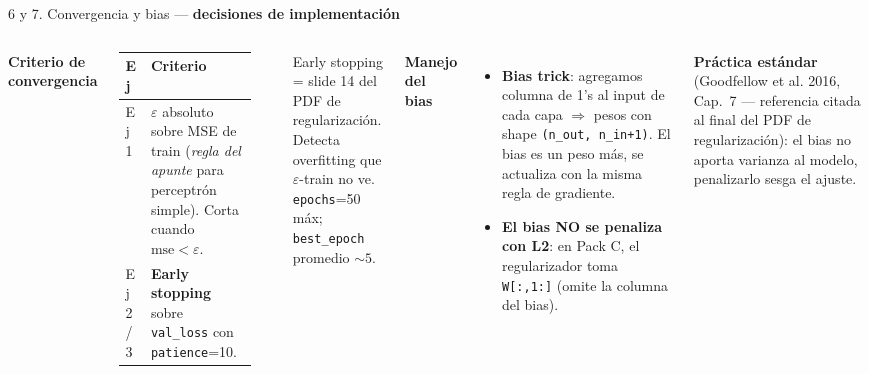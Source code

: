 \documentclass[11pt,aspectratio=169]{beamer}
\newcommand{\code}[1]{\texttt{\textcolor{accent}{#1}}}
\begin{document}
\begin{frame}{6 y 7. Convergencia y bias — \textbf{decisiones de implementación}}
\small
\begin{columns}[T]
\textbf{Criterio de convergencia}\\[0.3em]

\begin{tabular}{@{}p{0.16\linewidth}p{0.78\linewidth}@{}}
\toprule
\textbf{Ej} & \textbf{Criterio} \\
\midrule
Ej 1 & $\varepsilon$ absoluto sobre MSE de train (\emph{regla del apunte} para perceptrón simple). Corta cuando $\text{mse} < \varepsilon$. \\
\rowcolor{accent2!10}
Ej 2/3 & \textbf{Early stopping} sobre \code{val\_loss} con \code{patience}=10. \\
\bottomrule
\end{tabular}\\[0.5em]

\begin{insight}
Early stopping = slide 14 del PDF de regularización. Detecta overfitting que $\varepsilon$-train no ve.\\[0.2em]
\code{epochs}=50 máx; \code{best\_epoch} promedio $\sim 5$.
\end{insight}

\textbf{Manejo del bias}\\[0.3em]

\begin{itemize}\setlength\itemsep{0.2em}
  \item \textbf{Bias trick}: agregamos columna de 1's al input de cada capa $\Rightarrow$ pesos con shape \code{(n\_out, n\_in+1)}. El bias es un peso más, se actualiza con la misma regla de gradiente.
  \item \textbf{El bias NO se penaliza con L2}: en Pack C, el regularizador toma \code{W[:,1:]} (omite la columna del bias).
\end{itemize}
\vspace{0.4em}

\begin{takeaway}
\textbf{Práctica estándar} (Goodfellow et al. 2016, Cap.~7 — referencia citada al final del PDF de regularización): el bias no aporta varianza al modelo, penalizarlo sesga el ajuste.
\end{takeaway}
\end{columns}
\end{frame}
\end{document}
